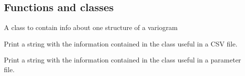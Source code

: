 \documentclass[letterpaper,10pt,english]{sphinxmanual}
\begin{document}
\subsection{Functions and classes}
\label{\detokenize{appendices:functions-and-classes}}

\begin{fulllineitems}
\label{\detokenize{appendices:s2Dcd.gslibnumpy.VarioStruct}}
A class to contain info about one structure of a variogram

\begin{fulllineitems}
\label{\detokenize{appendices:s2Dcd.gslibnumpy.VarioStruct.print4csv}}
Print a string with the information contained in the class
useful in a CSV file.

\end{fulllineitems}


\begin{fulllineitems}
\label{\detokenize{appendices:s2Dcd.gslibnumpy.VarioStruct.print4par}}
Print a string with the information contained in the class
useful in a parameter file.

\end{fulllineitems}


\end{fulllineitems}

\end{document}
